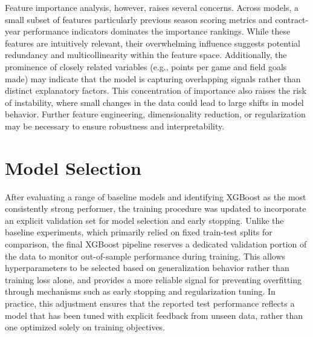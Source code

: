 \documentclass[conference]{IEEEtran}
\begin{document}
Feature importance analysis, however, raises several concerns. Across models, a small subset of features particularly previous season scoring metrics and contract-year performance indicators dominates the importance rankings. While these features are intuitively relevant, their overwhelming influence suggests potential redundancy and multicollinearity within the feature space. Additionally, the prominence of closely related variables (e.g., points per game and field goals made) may indicate that the model is capturing overlapping signals rather than distinct explanatory factors. This concentration of importance also raises the risk of instability, where small changes in the data could lead to large shifts in model behavior. Further feature engineering, dimensionality reduction, or regularization may be necessary to ensure robustness and interpretability.



\section{Model Selection}
After evaluating a range of baseline models and identifying XGBoost as the most consistently strong performer, the training procedure was updated to incorporate an explicit validation set for model selection and early stopping. Unlike the baseline experiments, which primarily relied on fixed train-test splits for comparison, the final XGBoost pipeline reserves a dedicated validation portion of the data to monitor out-of-sample performance during training. This allows hyperparameters to be selected based on generalization behavior rather than training loss alone, and provides a more reliable signal for preventing overfitting through mechanisms such as early stopping and regularization tuning. In practice, this adjustment ensures that the reported test performance reflects a model that has been tuned with explicit feedback from unseen data, rather than one optimized solely on training objectives.
\end{document}
